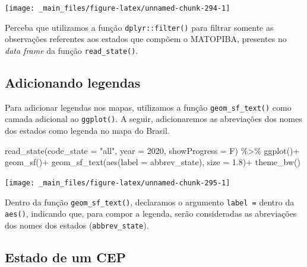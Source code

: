 \documentclass[
  brazilian,
]{book}
\newenvironment{Shaded}{\begin{snugshade}}{\end{snugshade}}
\newcommand{\AttributeTok}[1]{\textcolor[rgb]{0.77,0.63,0.00}{#1}}
\newcommand{\DecValTok}[1]{\textcolor[rgb]{0.00,0.00,0.81}{#1}}
\newcommand{\FloatTok}[1]{\textcolor[rgb]{0.00,0.00,0.81}{#1}}
\newcommand{\FunctionTok}[1]{\textcolor[rgb]{0.00,0.00,0.00}{#1}}
\newcommand{\NormalTok}[1]{#1}
\newcommand{\SpecialCharTok}[1]{\textcolor[rgb]{0.00,0.00,0.00}{#1}}
\newcommand{\StringTok}[1]{\textcolor[rgb]{0.31,0.60,0.02}{#1}}
\begin{document}
\begin{center}\texttt{[image: \_main\_files/figure-latex/unnamed-chunk-294-1]} \end{center}

Perceba que utilizamos a função \texttt{dplyr::filter()} para filtrar somente as observações referentes aos estados que compõem o MATOPIBA, presentes no \emph{data frame} da função \texttt{read\_state()}.

\hypertarget{leg}{%
\subsection{Adicionando legendas}\label{leg}}

Para adicionar legendas nos mapas, utilizamos a função \texttt{geom\_sf\_text()} como camada adicional ao \texttt{ggplot()}. A seguir, adicionaremos as abreviações dos nomes dos estados como legenda no mapa do Brasil.

\begin{Shaded}
\begin{Highlighting}[]
\FunctionTok{read\_state}\NormalTok{(}\AttributeTok{code\_state =} \StringTok{"all"}\NormalTok{,}
           \AttributeTok{year =} \DecValTok{2020}\NormalTok{,}
           \AttributeTok{showProgress =}\NormalTok{ F) }\SpecialCharTok{\%\textgreater{}\%} 
  \FunctionTok{ggplot}\NormalTok{()}\SpecialCharTok{+}
  \FunctionTok{geom\_sf}\NormalTok{()}\SpecialCharTok{+}
  \FunctionTok{geom\_sf\_text}\NormalTok{(}\FunctionTok{aes}\NormalTok{(}\AttributeTok{label =}\NormalTok{ abbrev\_state), }\AttributeTok{size =} \FloatTok{1.8}\NormalTok{)}\SpecialCharTok{+}
  \FunctionTok{theme\_bw}\NormalTok{()}
\end{Highlighting}
\end{Shaded}

\begin{center}\texttt{[image: \_main\_files/figure-latex/unnamed-chunk-295-1]} \end{center}

Dentro da função \texttt{geom\_sf\_text()}, declaramos o argumento \texttt{label\ =} dentro da \texttt{aes()}, indicando que, para compor a legenda, serão consideradas as abreviações dos nomes dos estados (\texttt{abbrev\_state}).

\hypertarget{estado-de-um-cep}{%
\subsection{Estado de um CEP}\label{estado-de-um-cep}}
\end{document}
